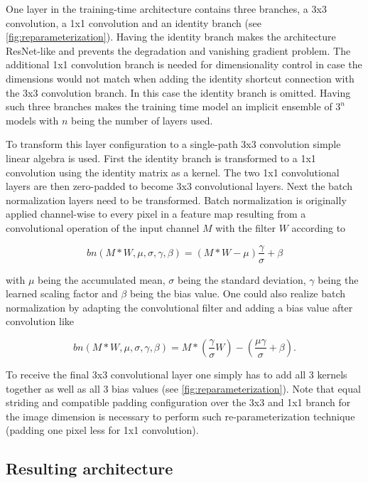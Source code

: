 One layer in the training-time architecture contains three branches, a 3x3 convolution, a 1x1 convolution and an identity branch (see \autoref{fig:reparameterization}). Having the identity branch makes the architecture ResNet-like and prevents the degradation and vanishing gradient problem. The additional 1x1 convolution branch is needed for dimensionality control in case the dimensions would not match when adding the identity shortcut connection with the 3x3 convolution branch. In this case the identity branch is omitted. Having such three branches makes the training time model an implicit ensemble of $3^n$ models with $n$ being the number of layers used. 

To transform this layer configuration to a single-path 3x3 convolution simple linear algebra is used. First the identity branch is transformed to a 1x1 convolution using the identity matrix as a kernel. The two 1x1 convolutional layers are then zero-padded to become 3x3 convolutional layers. Next the batch normalization layers need to be transformed. Batch normalization is originally applied channel-wise to every pixel in a feature map resulting from a convolutional operation of the input channel $M$ with the filter $W$ according to 

\begin{equation} \label{eq:batchnormalization}
	bn(M*W, \mu, \sigma, \gamma, \beta) = (M*W - \mu)\frac{\gamma}{\sigma} + \beta
\end{equation}

with $\mu$ being the accumulated mean, $\sigma$ being the standard deviation, $\gamma$ being the learned scaling factor and $\beta$ being the bias value. One could also realize batch normalization by adapting the convolutional filter and adding a bias value after convolution like 

\begin{equation} \label{eq:batchnormalizationtransformed}
	bn(M*W, \mu, \sigma, \gamma, \beta) = M*(\frac{\gamma}{\sigma}W) - (\frac{\mu\gamma}{\sigma} + \beta).
\end{equation}

To receive the final 3x3 convolutional layer one simply has to add all 3 kernels together as well as all 3 bias values (see \autoref{fig:reparameterization}). Note that equal striding and compatible padding configuration over the 3x3 and 1x1 branch for the image dimension is necessary to perform such re-parameterization technique (padding one pixel less for 1x1 convolution). 

\subsection{Resulting architecture}

